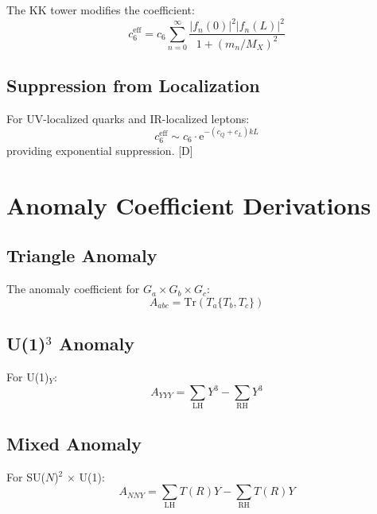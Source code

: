 \documentclass[11pt,a4paper]{article}
\newcommand{\Tr}{\mathrm{Tr}}
\newcommand{\ee}{\mathrm{e}}
\begin{document}
The KK tower modifies the coefficient:
\begin{equation}
c_6^{\text{eff}} = c_6 \sum_{n=0}^{\infty} \frac{|f_n(0)|^2 |f_n(L)|^2}{1 + (m_n/M_X)^2}
\label{eq:kk-proton}
\end{equation}

\subsection{Suppression from Localization}

For UV-localized quarks and IR-localized leptons:
\begin{equation}
c_6^{\text{eff}} \sim c_6 \cdot \ee^{-(c_Q + c_L)kL}
\label{eq:localization-suppression}
\end{equation}
providing exponential suppression. [D]

\section{Anomaly Coefficient Derivations}
\label{app:anomaly-coeff}

\subsection{Triangle Anomaly}

The anomaly coefficient for $G_a \times G_b \times G_c$:
\begin{equation}
A_{abc} = \Tr(T_a\{T_b, T_c\})
\label{eq:triangle}
\end{equation}

\subsection{U(1)$^3$ Anomaly}

For U(1)$_Y$:
\begin{equation}
A_{YYY} = \sum_{\text{LH}} Y^3 - \sum_{\text{RH}} Y^3
\label{eq:u1-cube}
\end{equation}

\subsection{Mixed Anomaly}

For SU($N$)$^2$ $\times$ U(1):
\begin{equation}
A_{NN Y} = \sum_{\text{LH}} T(R) Y - \sum_{\text{RH}} T(R) Y
\label{eq:mixed-anomaly}
\end{equation}
\end{document}
